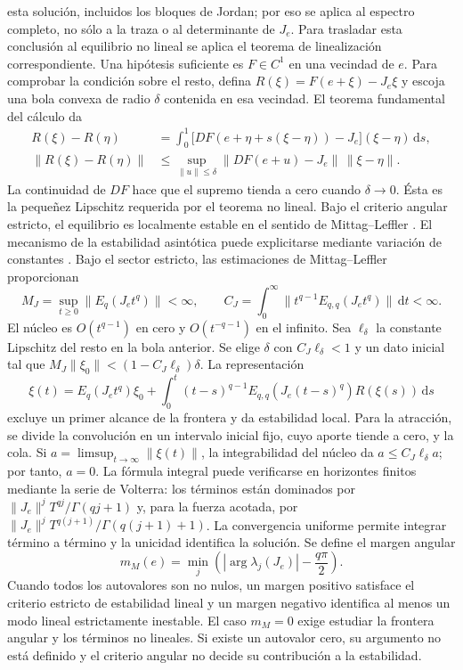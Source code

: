 esta solución, incluidos los bloques de Jordan; por eso se aplica al
espectro completo, no sólo a la traza o al determinante de \(J_e\).
Para trasladar esta conclusión al equilibrio no lineal se aplica el teorema de
linealización correspondiente. Una hipótesis suficiente es \(F\in C^1\) en
una vecindad de \(e\). Para comprobar la condición sobre el resto, defina
\(R(\xi)=F(e+\xi)-J_e\xi\) y escoja una bola convexa de radio
\(\delta\) contenida en esa vecindad. El teorema fundamental del cálculo da
\begin{align*}
 R(\xi)-R(\eta)
 &=\int_0^1\bigl[DF(e+\eta+s(\xi-\eta))-J_e\bigr]
                (\xi-\eta)\,\mathrm ds,\\
 \|R(\xi)-R(\eta)\|
 &\leq\sup_{\|u\|\leq\delta}\|DF(e+u)-J_e\|\,
          \|\xi-\eta\|.
\end{align*}
La continuidad de \(DF\) hace que el supremo tienda a cero cuando
\(\delta\to0\). Ésta es la pequeñez Lipschitz requerida por el teorema
no lineal. Bajo el criterio angular
estricto, el equilibrio es localmente estable en el sentido de
Mittag--Leffler \cite{CongTuanTrinh2020Asymptotic}.
El mecanismo de la estabilidad asintótica puede explicitarse mediante
variación de constantes \cite{CongDoanSiegmundTuan2016}. Bajo el sector
estricto, las estimaciones de Mittag--Leffler proporcionan
\[
 M_J=\sup_{t\ge0}\|E_q(J_et^q)\|<\infty,\qquad
 C_J=\int_0^\infty\|t^{q-1}E_{q,q}(J_et^q)\|\,\mathrm dt<\infty.
\]
El núcleo es $O(t^{q-1})$ en cero y $O(t^{-q-1})$ en el infinito.
Sea $\ell_\delta$ la constante Lipschitz del resto en la bola anterior.
Se elige $\delta$ con $C_J\ell_\delta<1$ y un dato inicial tal que
$M_J\|\xi_0\|<(1-C_J\ell_\delta)\delta$. La representación
\[
 \xi(t)=E_q(J_et^q)\xi_0+
 \int_0^t(t-s)^{q-1}E_{q,q}(J_e(t-s)^q)R(\xi(s))\,\mathrm ds
\]
excluye un primer alcance de la frontera y da estabilidad local.
Para la atracción, se divide la convolución en un intervalo inicial fijo,
cuyo aporte tiende a cero, y la cola. Si
$a=\limsup_{t\to\infty}\|\xi(t)\|$, la integrabilidad del núcleo da
$a\le C_J\ell_\delta a$; por tanto, $a=0$.
La fórmula integral puede verificarse en horizontes finitos mediante la
serie de Volterra: los términos están dominados por
$\|J_e\|^jT^{qj}/\Gamma(qj+1)$ y, para la fuerza acotada, por
$\|J_e\|^jT^{q(j+1)}/\Gamma(q(j+1)+1)$. La convergencia uniforme
permite integrar término a término y la unicidad identifica la solución.
Se define el margen angular
\begin{equation}
m_M(e)=
\min_j\left(
|\arg\lambda_j(J_e)|-\frac{q\pi}{2}
\right).
\label{eq:margen_matignon}
\end{equation}
Cuando todos los autovalores son no nulos, un margen positivo satisface el
criterio estricto de estabilidad lineal y un margen negativo identifica al
menos un modo lineal estrictamente inestable. El caso \(m_M=0\) exige estudiar
la frontera angular y los términos no lineales. Si existe un autovalor cero,
su argumento no está definido y el criterio angular no decide su contribución
a la estabilidad.

